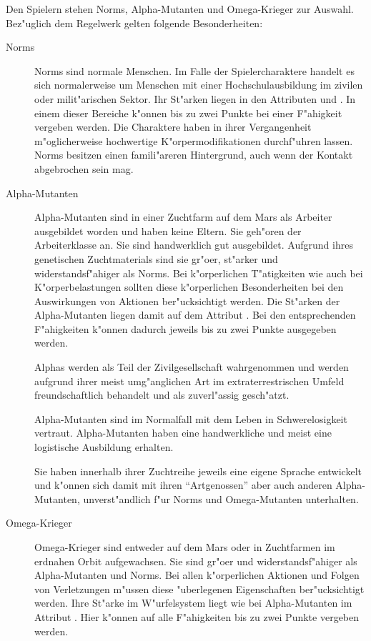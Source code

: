 
Den Spielern stehen Norms, Alpha-Mutanten und Omega-Krieger zur Auswahl. Bez"uglich dem Regelwerk gelten folgende Besonderheiten:

\begin{description}
    \item[Norms] Norms sind normale Menschen. Im Falle der Spielercharaktere handelt es sich normalerweise um Menschen mit einer 
        Hochschulausbildung im zivilen oder milit"arischen Sektor. Ihr St"arken liegen in den Attributen  und . In einem dieser Bereiche k"onnen bis zu zwei Punkte bei einer F"ahigkeit vergeben werden.  Die Charaktere haben in ihrer Vergangenheit m"oglicherweise hochwertige K"orpermodifikationen durchf"uhren lassen. Norms besitzen einen famili"areren Hintergrund, auch wenn der Kontakt abgebrochen sein mag.
    \item[Alpha-Mutanten] Alpha-Mutanten sind in einer Zuchtfarm auf dem Mars als Arbeiter ausgebildet worden und haben keine Eltern. 
        Sie geh"oren der Arbeiterklasse an. Sie sind handwerklich gut ausgebildet. Aufgrund ihres genetischen Zuchtmaterials sind sie gr"o\3er, st"arker und widerstandsf"ahiger als Norms. Bei k"orperlichen T"atigkeiten wie auch bei K"orperbelastungen sollten diese k"orperlichen Besonderheiten bei den Auswirkungen von Aktionen ber"ucksichtigt werden. Die St"arken der Alpha-Mutanten liegen damit auf dem Attribut . Bei den entsprechenden F"ahigkeiten k"onnen dadurch jeweils bis zu zwei Punkte ausgegeben werden. 
        
        Alphas werden als Teil der Zivilgesellschaft wahrgenommen und werden aufgrund ihrer meist umg"anglichen Art im extraterrestrischen Umfeld freundschaftlich behandelt und als zuverl"assig gesch"atzt. 
        
        Alpha-Mutanten sind im Normalfall mit dem Leben in Schwerelosigkeit vertraut. Alpha-Mutanten haben eine handwerkliche und meist eine logistische Ausbildung erhalten. 
        
        Sie haben innerhalb ihrer Zuchtreihe jeweils eine eigene Sprache entwickelt und k"onnen sich damit mit ihren ``Artgenossen'' aber auch anderen Alpha-Mutanten, unverst"andlich f"ur Norms und Omega-Mutanten unterhalten. 
    \item[Omega-Krieger] Omega-Krieger sind entweder auf dem Mars oder in Zuchtfarmen im erdnahen Orbit aufgewachsen. Sie sind   
        gr"o\3er und widerstandsf"ahiger als Alpha-Mutanten und Norms. Bei allen k"orperlichen Aktionen und Folgen von Verletzungen m"ussen diese "uberlegenen Eigenschaften ber"ucksichtigt werden. Ihre St"arke im W"urfelsystem liegt wie bei Alpha-Mutanten im Attribut . Hier k"onnen auf alle F"ahigkeiten bis zu zwei Punkte vergeben werden. 
        

\end{description}
